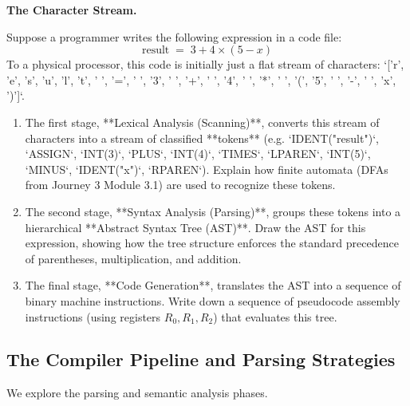 \documentclass[12pt, a4paper]{book}
\begin{document}
\begin{puzzlebox}
\textbf{The Character Stream.}

Suppose a programmer writes the following expression in a code file:
\[
  \text{result} \;=\; 3 + 4 \times (5 - x)
\]
To a physical processor, this code is initially just a flat stream of characters: `['r', 'e', 's', 'u', 'l', 't', ' ', '=', ' ', '3', ' ', '+', ' ', '4', ' ', '*', ' ', '(', '5', ' ', '-', ' ', 'x', ')']`.
\begin{enumerate}[label=(\alph*), leftmargin=*]
  \item The first stage, **Lexical Analysis (Scanning)**, converts this stream of characters into a stream of classified **tokens** (e.g. `IDENT("result")`, `ASSIGN`, `INT(3)`, `PLUS`, `INT(4)`, `TIMES`, `LPAREN`, `INT(5)`, `MINUS`, `IDENT("x")`, `RPAREN`).
        Explain how finite automata (DFAs from Journey 3 Module 3.1) are used to recognize these tokens.
  \item The second stage, **Syntax Analysis (Parsing)**, groups these tokens into a hierarchical **Abstract Syntax Tree (AST)**.
        Draw the AST for this expression, showing how the tree structure enforces the standard precedence of parentheses, multiplication, and addition.
  \item The final stage, **Code Generation**, translates the AST into a sequence of binary machine instructions.
        Write down a sequence of pseudocode assembly instructions (using registers $R_0, R_1, R_2$) that evaluates this tree.
\end{enumerate}
\end{puzzlebox}

\subsection{The Compiler Pipeline and Parsing Strategies}

We explore the parsing and semantic analysis phases.
\end{document}
